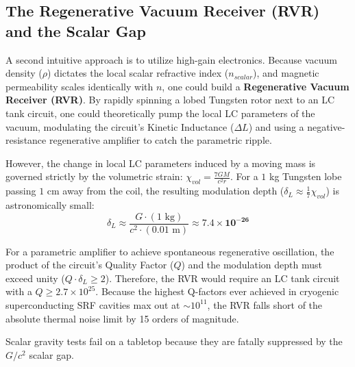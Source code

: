 \subsection{The Regenerative Vacuum Receiver (RVR) and the Scalar Gap}
A second intuitive approach is to utilize high-gain electronics. Because vacuum density ($\rho$) dictates the local scalar refractive index ($n_{scalar}$), and magnetic permeability scales identically with $n$, one could build a \textbf{Regenerative Vacuum Receiver (RVR)}. By rapidly spinning a lobed Tungsten rotor next to an LC tank circuit, one could theoretically pump the local LC parameters of the vacuum, modulating the circuit's Kinetic Inductance ($\Delta L$) and using a negative-resistance regenerative amplifier to catch the parametric ripple.

However, the change in local LC parameters induced by a moving mass is governed strictly by the volumetric strain: $\chi_{vol} = \frac{7GM}{c^2 r}$. For a $1$ kg Tungsten lobe passing $1$ cm away from the coil, the resulting modulation depth ($\delta_L \approx \frac{1}{7}\chi_{vol}$) is astronomically small:
\begin{equation}
    \delta_L \approx \frac{G \cdot (1\text{ kg})}{c^2 \cdot (0.01\text{ m})} \approx \mathbf{7.4 \times 10^{-26}}
\end{equation}

For a parametric amplifier to achieve spontaneous regenerative oscillation, the product of the circuit's Quality Factor ($Q$) and the modulation depth must exceed unity ($Q \cdot \delta_L \ge 2$). Therefore, the RVR would require an LC tank circuit with a $Q \ge 2.7 \times 10^{25}$. Because the highest Q-factors ever achieved in cryogenic superconducting SRF cavities max out at $\sim 10^{11}$, the RVR falls short of the absolute thermal noise limit by 15 orders of magnitude.

Scalar gravity tests fail on a tabletop because they are fatally suppressed by the $G/c^2$ scalar gap.